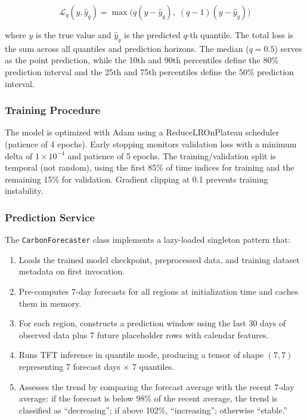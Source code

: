 \documentclass[conference]{IEEEtran}
\begin{document}
\begin{equation}
\mathcal{L}_q(y, \hat{y}_q) = \max\big(q(y - \hat{y}_q), \; (q-1)(y - \hat{y}_q)\big)
\label{eq:quantile_loss}
\end{equation}

\noindent where $y$ is the true value and $\hat{y}_q$ is the predicted $q$-th quantile. The total loss is the sum across all quantiles and prediction horizons. The median ($q = 0.5$) serves as the point prediction, while the 10th and 90th percentiles define the 80\% prediction interval and the 25th and 75th percentiles define the 50\% prediction interval.

\subsubsection{Training Procedure}

The model is optimized with Adam using a ReduceLROnPlateau scheduler (patience of 4 epochs). Early stopping monitors validation loss with a minimum delta of $1 \times 10^{-4}$ and patience of 5 epochs. The training/validation split is temporal (not random), using the first 85\% of time indices for training and the remaining 15\% for validation. Gradient clipping at 0.1 prevents training instability.

\subsubsection{Prediction Service}

The \texttt{CarbonForecaster} class implements a lazy-loaded singleton pattern that:

\begin{enumerate}
    \item Loads the trained model checkpoint, preprocessed data, and training dataset metadata on first invocation.
    \item Pre-computes 7-day forecasts for all regions at initialization time and caches them in memory.
    \item For each region, constructs a prediction window using the last 30 days of observed data plus 7 future placeholder rows with calendar features.
    \item Runs TFT inference in quantile mode, producing a tensor of shape $(7, 7)$ representing 7 forecast days $\times$ 7 quantiles.
    \item Assesses the trend by comparing the forecast average with the recent 7-day average: if the forecast is below 98\% of the recent average, the trend is classified as ``decreasing''; if above 102\%, ``increasing''; otherwise ``stable.''
\end{enumerate}
\end{document}
